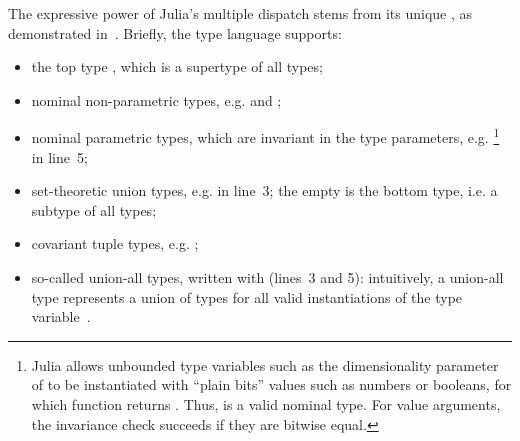 The expressive power of Julia's multiple dispatch stems from 
its unique , as
demonstrated in~.
Briefly, the type language supports:
\begin{itemize}
  \item the top type , which is a supertype of all types;
  \item nominal non-parametric types, e.g.  and ;
  \item nominal parametric types, which are invariant in the type parameters, 
        e.g. \footnote{Julia allows unbounded type
        variables such as the dimensionality parameter  
        of 
        to be instantiated with ``plain bits'' values such as numbers or
        booleans, for which
        \href{https://docs.julialang.org/en/v1/base/base/\#Base.isbits}{}
        function returns .
        Thus,  is a valid nominal type.
        For value arguments, the invariance check succeeds if they
        are bitwise equal.}
        in line~5;
  \item set-theoretic union types, e.g. 
     in line~3;
    the empty  is the bottom type, i.e. a subtype
    of all types;
  \item covariant tuple types, e.g. ;
  \item so-called union-all types, written with  (lines~3 and 5):
    intuitively, a union-all type  represents a union of types
     for all valid instantiations  of the type
    variable~.
\end{itemize}



